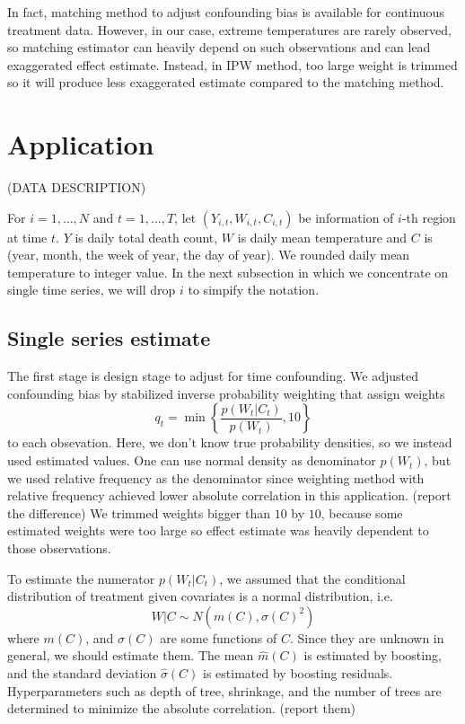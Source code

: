 \documentclass[12pt]{article}
\begin{document}
In fact, matching method to adjust confounding bias is available for continuous treatment data\cite{wu2020arxiv}.
However, in our case, extreme temperatures are rarely observed,
so matching estimator can heavily depend on such observations and can lead exaggerated effect estimate.
Instead, in IPW method, too large weight is trimmed so it will produce less exaggerated estimate
compared to the matching method.

\section{Application}

(DATA DESCRIPTION)

For $i = 1, \dots, N$ and $t = 1, \dots, T$, 
let $(Y_{i,t}, W_{i,t}, C_{i,t})$ be information of $i$-th region at time $t$.
$Y$ is daily total death count, $W$ is daily mean temperature 
and $C$ is (year, month, the week of year, the day of year).
We rounded daily mean temperature to integer value.
In the next subsection in which we concentrate on single time series, 
we will drop $i$ to simpify the notation.

\subsection{Single series estimate}

The first stage is design stage to adjust for time confounding.
We adjusted confounding bias by stabilized inverse probability weighting\cite{sipw2010}
that assign weights
\[
	q_t = \min{ \left \{ \frac{p(W_t \lvert C_t)}{p(W_t)}, 10 \right \} }
\]
to each obsevation.
Here, we don't know true probability densities,
so we instead used estimated values.
One can use normal density as denominator $p(W_t)$,
but we used relative frequency as the denominator
since weighting method with relative frequency achieved 
lower absolute correlation in this application. (report the difference)
We trimmed weights bigger than $10$ by $10$,
because some estimated weights were too large so
effect estimate was heavily dependent to those observations.

To estimate the numerator $p(W_t \lvert C_t)$, 
we assumed that the conditional distribution of treatment given covariates is a normal distribution, i.e.
\[ 
	W\lvert C \sim N(m(C), \sigma(C)^2) 
\] 
where $m(C)$, and $\sigma(C)$ are some functions of $C$.
Since they are unknown in general, we should estimate them. 
The mean $\hat{m}(C)$ is estimated by boosting, 
and the standard deviation $\hat{\sigma}(C)$ is estimated by boosting residuals\cite{hirano2004, gpsboosting2015}.
Hyperparameters such as depth of tree, shrinkage, and the number of trees are determined
to minimize the absolute correlation. (report them)
\end{document}
